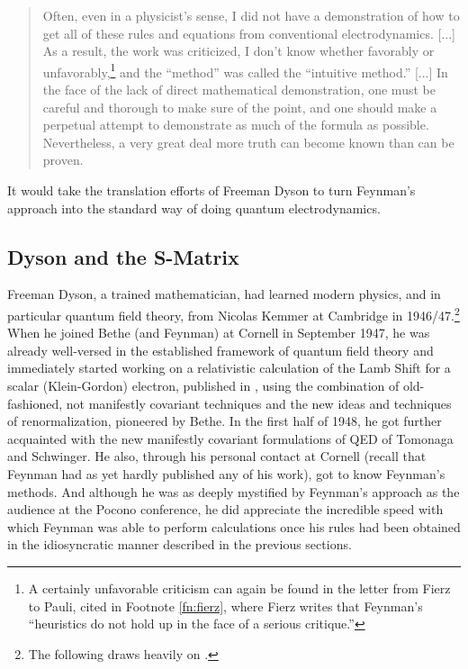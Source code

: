 \documentclass[12pt,a4paper]{article}
\begin{document}
\begin{quote}
Often, even in a physicist's sense, I did not have a demonstration of how to get all of these rules and equations from conventional electrodynamics. [...] As a result, the work was criticized, I don't know whether favorably or unfavorably,\footnote{A certainly unfavorable criticism can again be found in the letter from Fierz to Pauli, cited in Footnote \ref{fn:fierz}, where Fierz writes that Feynman's ``heuristics do not hold up in the face of a serious critique.''} and the ``method'' was called the ``intuitive method.'' [...] In the face of the lack of direct mathematical demonstration, one must be careful and thorough to make sure of the point, and one should make a perpetual attempt to demonstrate as much of the formula as possible. Nevertheless, a very great deal more truth can become known than can be proven.
\end{quote}

It would take the translation efforts of Freeman Dyson to turn Feynman's approach into the standard way of doing quantum electrodynamics.

\subsection{Dyson and the S-Matrix}

Freeman Dyson, a trained mathematician, had learned modern physics, and in particular quantum field theory, from Nicolas Kemmer at Cambridge in 1946/47.\footnote{The following draws heavily on \citep[ch. 9]{schweber_1994_qed}.}  When he joined Bethe (and Feynman) at Cornell in September 1947, he was already well-versed in the established framework of quantum field theory and immediately started working on a relativistic calculation of the Lamb Shift for a scalar (Klein-Gordon) electron, published in \citep{dyson_1948_the-electromagnetic}, using the combination of old-fashioned, not manifestly covariant techniques and the new ideas and techniques of renormalization, pioneered by Bethe. In the first half of 1948, he got further acquainted with the new manifestly covariant formulations of QED of Tomonaga and Schwinger. He also, through his personal contact at Cornell (recall that Feynman had as yet hardly published any of his work), got to know Feynman's methods. And although he was as deeply mystified by Feynman's approach as the audience at the Pocono conference, he did appreciate the incredible speed with which Feynman was able to perform calculations once his rules had been obtained in the idiosyncratic manner described in the previous sections.
\end{document}
